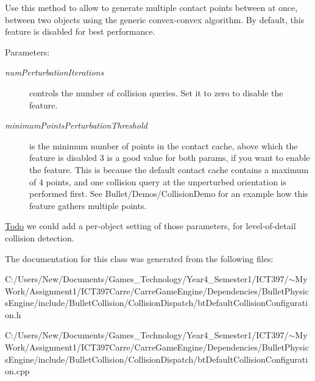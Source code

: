 Use this method to allow to generate multiple contact points between at once, between two objects using the generic convex-convex algorithm. By default, this feature is disabled for best performance. \begin{Desc}
\item[Parameters:]
\begin{description}
\item[{\em numPerturbationIterations}]controls the number of collision queries. Set it to zero to disable the feature. \item[{\em minimumPointsPerturbationThreshold}]is the minimum number of points in the contact cache, above which the feature is disabled 3 is a good value for both params, if you want to enable the feature. This is because the default contact cache contains a maximum of 4 points, and one collision query at the unperturbed orientation is performed first. See Bullet/Demos/CollisionDemo for an example how this feature gathers multiple points. \end{description}
\end{Desc}
\begin{Desc}
\item[\hyperlink{todo__todo000013}{Todo}]we could add a per-object setting of those parameters, for level-of-detail collision detection. \end{Desc}


The documentation for this class was generated from the following files:\begin{CompactItemize}
\item 
C:/Users/New/Documents/Games\_\-Technology/Year4\_\-Semester1/ICT397/$\sim$My Work/Assignment1/ICT397Carre/CarreGameEngine/Dependencies/BulletPhysicsEngine/include/BulletCollision/CollisionDispatch/btDefaultCollisionConfiguration.h\item 
C:/Users/New/Documents/Games\_\-Technology/Year4\_\-Semester1/ICT397/$\sim$My Work/Assignment1/ICT397Carre/CarreGameEngine/Dependencies/BulletPhysicsEngine/include/BulletCollision/CollisionDispatch/btDefaultCollisionConfiguration.cpp\end{CompactItemize}
